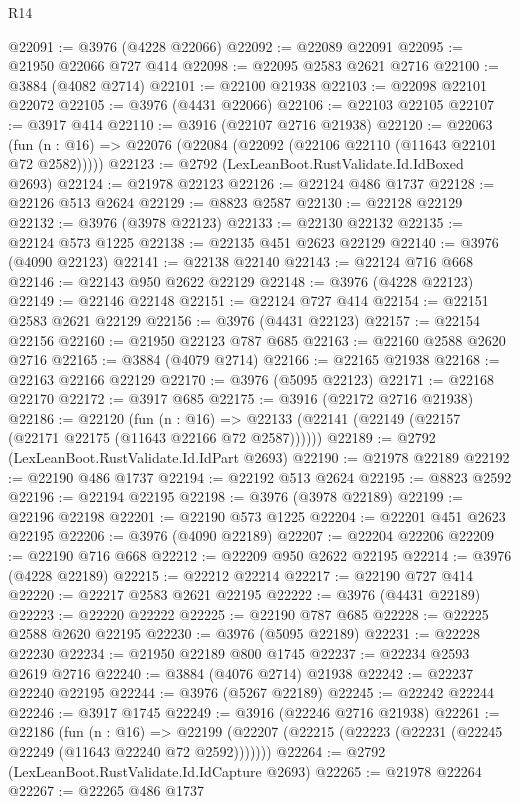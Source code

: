 \begin{lexlean}{R14}
\begin{coremodule}
@22091 := @3976 (@4228 @22066)
@22092 := @22089 @22091
@22095 := @21950 @22066 @727 @414
@22098 := @22095 @2583 @2621 @2716
@22100 := @3884 (@4082 @2714)
@22101 := @22100 @21938
@22103 := @22098 @22101 @22072
@22105 := @3976 (@4431 @22066)
@22106 := @22103 @22105
@22107 := @3917 @414
@22110 := @3916 (@22107 @2716 @21938)
@22120 := @22063
    (fun (n : @16) => @22076 (@22084 (@22092 (@22106 @22110 (@11643 @22101 @72 @2582)))))
@22123 := @2792 (LexLeanBoot.RustValidate.Id.IdBoxed @2693)
@22124 := @21978 @22123
@22126 := @22124 @486 @1737
@22128 := @22126 @513 @2624
@22129 := @8823 @2587
@22130 := @22128 @22129
@22132 := @3976 (@3978 @22123)
@22133 := @22130 @22132
@22135 := @22124 @573 @1225
@22138 := @22135 @451 @2623 @22129
@22140 := @3976 (@4090 @22123)
@22141 := @22138 @22140
@22143 := @22124 @716 @668
@22146 := @22143 @950 @2622 @22129
@22148 := @3976 (@4228 @22123)
@22149 := @22146 @22148
@22151 := @22124 @727 @414
@22154 := @22151 @2583 @2621 @22129
@22156 := @3976 (@4431 @22123)
@22157 := @22154 @22156
@22160 := @21950 @22123 @787 @685
@22163 := @22160 @2588 @2620 @2716
@22165 := @3884 (@4079 @2714)
@22166 := @22165 @21938
@22168 := @22163 @22166 @22129
@22170 := @3976 (@5095 @22123)
@22171 := @22168 @22170
@22172 := @3917 @685
@22175 := @3916 (@22172 @2716 @21938)
@22186 := @22120
    (fun (n : @16) => @22133 (@22141 (@22149 (@22157 (@22171 @22175 (@11643 @22166 @72 @2587))))))
@22189 := @2792 (LexLeanBoot.RustValidate.Id.IdPart @2693)
@22190 := @21978 @22189
@22192 := @22190 @486 @1737
@22194 := @22192 @513 @2624
@22195 := @8823 @2592
@22196 := @22194 @22195
@22198 := @3976 (@3978 @22189)
@22199 := @22196 @22198
@22201 := @22190 @573 @1225
@22204 := @22201 @451 @2623 @22195
@22206 := @3976 (@4090 @22189)
@22207 := @22204 @22206
@22209 := @22190 @716 @668
@22212 := @22209 @950 @2622 @22195
@22214 := @3976 (@4228 @22189)
@22215 := @22212 @22214
@22217 := @22190 @727 @414
@22220 := @22217 @2583 @2621 @22195
@22222 := @3976 (@4431 @22189)
@22223 := @22220 @22222
@22225 := @22190 @787 @685
@22228 := @22225 @2588 @2620 @22195
@22230 := @3976 (@5095 @22189)
@22231 := @22228 @22230
@22234 := @21950 @22189 @800 @1745
@22237 := @22234 @2593 @2619 @2716
@22240 := @3884 (@4076 @2714) @21938
@22242 := @22237 @22240 @22195
@22244 := @3976 (@5267 @22189)
@22245 := @22242 @22244
@22246 := @3917 @1745
@22249 := @3916 (@22246 @2716 @21938)
@22261 := @22186
    (fun (n : @16) =>
    @22199 (@22207 (@22215 (@22223 (@22231 (@22245 @22249 (@11643 @22240 @72 @2592)))))))
@22264 := @2792 (LexLeanBoot.RustValidate.Id.IdCapture @2693)
@22265 := @21978 @22264
@22267 := @22265 @486 @1737

\end{coremodule}
\end{lexlean}

